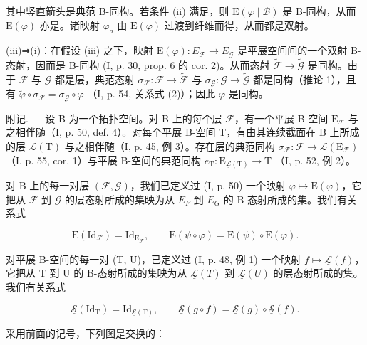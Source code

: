 其中竖直箭头是典范 B-同构。若条件 (ii) 满足，则 \(\mathrm{E}(\varphi \mid \mathcal{B})\) 是 B-同构，从而 \(\mathrm{E}(\varphi)\) 亦是。诸映射 \(\varphi_{a}\) 由 \(\mathrm{E}(\varphi)\) 过渡到纤维而得，从而都是双射。

(iii)⇒(i)：在假设 (iii) 之下，映射 \(\mathrm{E}(\varphi)\colon E_{\mathcal{F}} \to E_{\mathcal{G}}\) 是平展空间间的一个双射 B-态射，因而是 B-同构 (I, p. 30, prop. 6 的 cor. 2)。从而态射 \(\widetilde{\mathcal{F}}\to\widetilde{\mathcal{G}}\) 是同构。由于 \(\mathcal{F}\) 与 \(\mathcal{G}\) 都是层，典范态射 \(\sigma_{\mathcal{F}}\colon\mathcal{F}\to\widetilde{\mathcal{F}}\) 与 \(\sigma_{\mathcal{G}}\colon\mathcal{G}\to\widetilde{\mathcal{G}}\) 都是同构（推论 1），且有 \(\widetilde{\varphi}\circ\sigma_{\mathcal{F}}=\sigma_{\mathcal{G}}\circ\varphi\) （I, p. 54, 关系式 (2)）；因此 \(\varphi\) 是同构。

附记. --- 设 B 为一个拓扑空间。对 B 上的每个层 \(\mathcal{F}\)，有一个平展 B-空间 \(\mathrm{E}_{\mathcal{F}}\) 与之相伴随（I, p. 50, def. 4）。对每个平展 B-空间 T，有由其连续截面在 B 上所成的层 \(\underline{\mathcal{L}}(\mathrm{T})\) 与之相伴随（I, p. 45, 例 3）。存在层的典范同构 \(\sigma_{\mathcal{F}}\colon \mathcal{F}\to \underline{\mathcal{L}}(\mathrm{E}_{\mathcal{F}})\) （I, p. 55, cor. 1）与平展 B-空间的典范同构 \(e_{\mathrm{T}}\colon \mathrm{E}_{\underline{\mathcal{L}}(\mathrm{T})}\to \mathrm{T}\) （I, p. 52, 例 2）。

对 B 上的每一对层 \((\mathcal{F},\mathcal{G})\)，我们已定义过 (I, p. 50) 一个映射 \(\varphi\mapsto\mathrm{E}(\varphi)\)，它把从 \(\mathcal{F}\) 到 \(\mathcal{G}\) 的层态射所成的集映为从 \(E_{F}\) 到 \(E_{G}\) 的 B-态射所成的集。我们有关系式

\[
\mathrm{E} (\mathrm{Id} _ {\mathcal {F}}) = \mathrm{Id} _ {\mathrm{E} _ {\mathcal {F}}}, \qquad \mathrm{E} (\psi \circ \varphi) = \mathrm{E} (\psi) \circ \mathrm{E} (\varphi).
\]

对平展 B-空间的每一对 (T, U)，已定义过 (I, p. 48, 例 1) 一个映射 \(f \mapsto \underline{\mathcal{L}}(f)\)，它把从 T 到 U 的 B-态射所成的集映为从 \(\underline{\mathcal{L}}(T)\) 到 \(\underline{\mathcal{L}}(U)\) 的层态射所成的集。我们有关系式

\[
\underline {{\mathcal {S}}} (\mathrm{Id} _ {\mathrm{T}}) = \mathrm{Id} _ {\underline {{\mathcal {S}}} (\mathrm{T})}, \qquad \underline {{\mathcal {S}}} (g \circ f) = \underline {{\mathcal {S}}} (g) \circ \underline {{\mathcal {S}}} (f).
\]

采用前面的记号，下列图是交换的：

